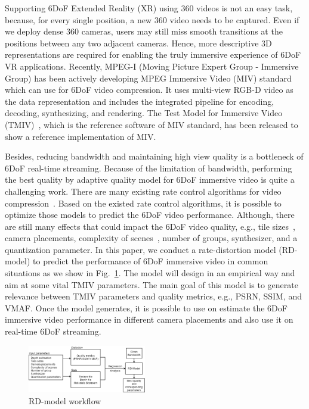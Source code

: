 Supporting 6DoF Extended Reality (XR) using 360{\degree} videos is not an easy task, because, for every single position, a new 360{\degree} video needs to be captured.
Even if we deploy dense 360{\degree} cameras, users may still miss smooth transitions at the positions between any two adjacent cameras.
Hence, more descriptive 3D representations are required for enabling the truly immersive experience of 6DoF VR applications.
Recently, MPEG-I (Moving Picture Expert Group - Immersive Group) has been actively developing MPEG Immersive Video (MIV) standard~\cite{BDDF+21, MPEG_MIV_web} which can use for 6DoF video compression.
It uses multi-view RGB-D video as the data representation and includes the integrated pipeline for encoding, decoding, synthesizing, and rendering.
The Test Model for Immersive Video (TMIV)~\cite{tmiv_doc,tmiv_gitlab}, which is the reference software of MIV standard, has been released to show a reference implementation of MIV.

Besides, reducing bandwidth and maintaining high view quality is a bottleneck of 6DoF real-time streaming.
Because of the limitation of bandwidth, performing the best quality by adaptive quality model for 6DoF immersive video is quite a challenging work.
There are many existing rate control algorithms for video compression~\cite{PZAB16}\cite{WYTC12}\cite{ZM01}.
Based on the existed rate control algorithms, it is possible to optimize those models to predict the 6DoF video performance.
Although, there are still many effects that could impact the 6DoF video quality, e.g., tile sizes~\cite{JLRL+20}, camera placements, complexity of scenes~\cite{SCB21}, number of groups, synthesizer, and a quantization parameter.
In this paper, we conduct a rate-distortion model (RD-model) to predict the performance of 6DoF immersive video in common situations as we show in Fig.~\ref{fig:RD_model_concept}.
The model will design in an empirical way and aim at some vital TMIV parameters.
The main goal of this model is to generate relevance between TMIV parameters and quality metrics, e.g., PSRN, SSIM, and VMAF.
Once the model generates, it is possible to use on estimate the 6DoF immersive video performance in different camera placements and also use it on real-time 6DoF streaming.

\begin{figure}[tbh]
    \centering
    \includegraphics[width=0.46\textwidth]{figs/RD_model_concept}
    \caption{RD-model workflow}
    \label{fig:RD_model_concept}
\end{figure}

